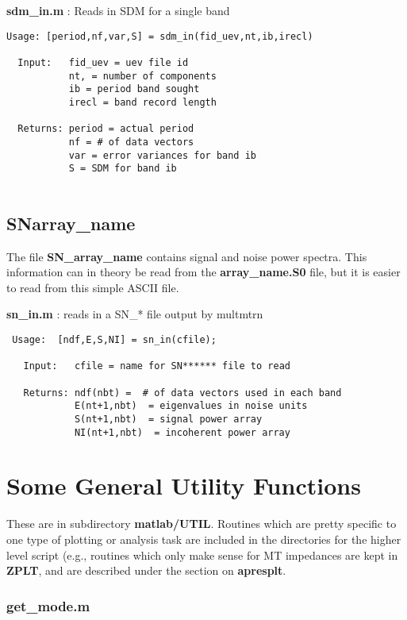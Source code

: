 {\bf sdm\_in.m}  : Reads in SDM for a single band 

\small
\begin{verbatim}
Usage: [period,nf,var,S] = sdm_in(fid_uev,nt,ib,irecl)

  Input:   fid_uev = uev file id
           nt, = number of components
           ib = period band sought
           irecl = band record length
           
  Returns: period = actual period
           nf = # of data vectors
           var = error variances for band ib
           S = SDM for band ib
           
\end{verbatim}
\normalsize

\subsection{SNarray\_name}

The file {\bf SN\_array\_name} contains signal and noise power spectra.
This information can in theory be read from the {\bf array\_name.S0} file,
but it is easier to read from this simple ASCII file.

{\bf sn\_in.m} : reads in a SN\_* file output by multmtrn

\small
\begin{verbatim}
 Usage:  [ndf,E,S,NI] = sn_in(cfile);
 
   Input:   cfile = name for SN****** file to read
 
   Returns: ndf(nbt) =  # of data vectors used in each band
            E(nt+1,nbt)  = eigenvalues in noise units
            S(nt+1,nbt)  = signal power array
            NI(nt+1,nbt)  = incoherent power array
\end{verbatim}
\normalsize

\section{Some General Utility Functions}

These are in subdirectory {\bf matlab/UTIL}.
Routines which are pretty specific to one type of plotting
or analysis task are included in the directories for the
higher level script (e.g., routines which only make sense for
MT impedances are kept in {\bf ZPLT}, and are described under
the section on {\bf apresplt}.


\subsubsection{get\_mode.m}


